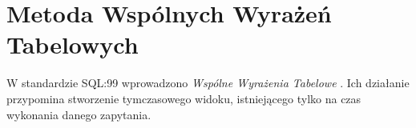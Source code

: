 \section{Metoda Wspólnych Wyrażeń Tabelowych}











W standardzie SQL:99 wprowadzono \emph{Wspólne Wyrażenia Tabelowe} .
Ich działanie przypomina stworzenie tymczasowego widoku, 
istniejącego tylko na czas wykonania danego zapytania.


